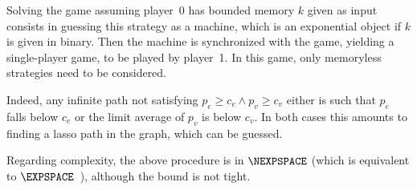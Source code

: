 Solving the game assuming player~0 has bounded memory $k$ given as input consists in guessing this strategy as a machine, which is an exponential object if $k$ is given in binary.
Then the machine is synchronized with the game, yielding a single-player game, to be played by player~1.
In this game, only memoryless strategies need to be considered.

Indeed, any infinite path not satisfying $p_e \geq c_e \wedge p_v \geq c_v$ either is such that $p_e$ falls below $c_e$ or the limit average of $p_v$ is below $c_v$.
In both cases this amounts to finding a lasso path in the graph, which can be guessed.

Regarding complexity, the above procedure is in $\NEXPSPACE$ (which is equivalent to $\EXPSPACE$~\cite[Chap.~20]{papadimitriou94}), although the bound is not tight.
